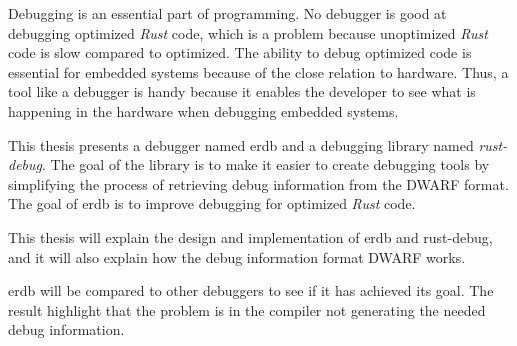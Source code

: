 Debugging is an essential part of programming.
No debugger is good at debugging optimized \emph{Rust} code, which is a problem because unoptimized \emph{Rust} code is slow compared to optimized.
The ability to debug optimized code is essential for embedded systems because of the close relation to hardware.
Thus, a tool like a debugger is handy because it enables the developer to see what is happening in the hardware when debugging embedded systems. 

This thesis presents a debugger named \acrshort{erdb} and a debugging library named \emph{rust-debug}.
The goal of the library is to make it easier to create debugging tools by simplifying the process of retrieving debug information from the \acrshort{DWARF} format.
The goal of \acrshort{erdb} is to improve debugging for optimized \emph{Rust} code. 

This thesis will explain the design and implementation of \acrshort{erdb} and rust-debug, and it will also explain how the debug information format \acrshort{DWARF} works.

\acrshort{erdb} will be compared to other debuggers to see if it has achieved its goal.
The result highlight that the problem is in the compiler not generating the needed debug information.
